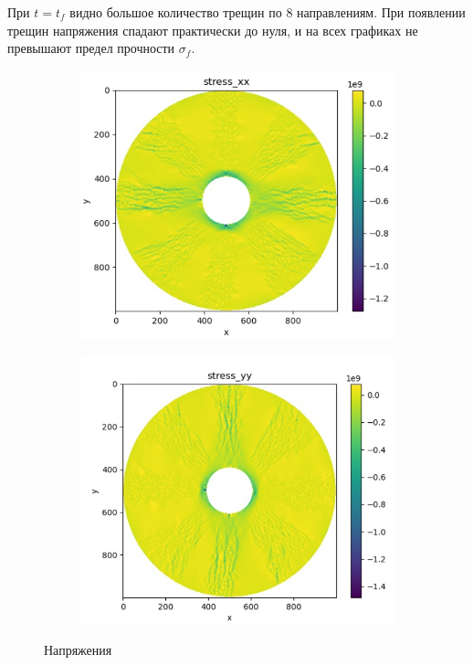 \documentclass[12pt, a4paper]{article}
\begin{document}
При $t=t_f$ видно большое количество трещин по 8 направлениям. При появлении трещин напряжения спадают практически до нуля, и на всех графиках не превышают предел прочности $\sigma_f$.
 \begin{figure}[H]
	\centering
	\begin{subfigure}[H]{0.38\textwidth}
		\includegraphics[width=\textwidth]{stressx_tf}
	\end{subfigure}
	\qquad\qquad
	\begin{subfigure}[H]{0.38\textwidth}
		\includegraphics[width=\textwidth]{stressy_tf}
	\end{subfigure}	
	\caption{Напряжения}
\end{figure}	
	
\end{document}
